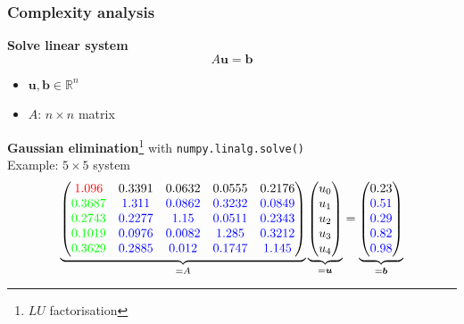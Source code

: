 \documentclass{beamer}
\begin{document}
\begin{frame}[fragile]
  \frametitle{Complexity analysis}
  \textbf{Solve linear system}
  $$
  A\boldsymbol{u}=\boldsymbol{b}$$
  \begin{itemize}
    \item $\boldsymbol{u}, \boldsymbol{b}\in\mathbb{R}^n$
    \item $A$: $n\times n$ matrix
  \end{itemize}
  \textbf{Gaussian elimination}\footnote{$LU$ factorisation} with \lstinline{numpy.linalg.solve()}\\[1ex]
  Example: $5\times 5$ system
$$
    \underbrace{
      \begin{pmatrix}
\textcolor{red}{1.096} & \textcolor{black}{0.3391} & \textcolor{black}{0.0632} & \textcolor{black}{0.0555} & \textcolor{black}{0.2176}\\
\textcolor{green}{0.3687} & \textcolor{blue}{1.311} & \textcolor{blue}{0.0862} & \textcolor{blue}{0.3232} & \textcolor{blue}{0.0849}\\
\textcolor{green}{0.2743} & \textcolor{blue}{0.2277} & \textcolor{blue}{1.15} & \textcolor{blue}{0.0511} & \textcolor{blue}{0.2343}\\
\textcolor{green}{0.1019} & \textcolor{blue}{0.0976} & \textcolor{blue}{0.0082} & \textcolor{blue}{1.285} & \textcolor{blue}{0.3212}\\
\textcolor{green}{0.3629} & \textcolor{blue}{0.2885} & \textcolor{blue}{0.012} & \textcolor{blue}{0.1747} & \textcolor{blue}{1.145}
\end{pmatrix}}_{=A}
\underbrace{\begin{pmatrix}
u_0 \\ u_1 \\ u_2 \\ u_3 \\ u_4
\end{pmatrix}}_{=\boldsymbol{u}}
=
\underbrace{
  \begin{pmatrix}
\textcolor{black}{0.23}\\
\textcolor{blue}{0.51}\\
\textcolor{blue}{0.29}\\
\textcolor{blue}{0.82}\\
\textcolor{blue}{0.98}
\end{pmatrix}}_{=\boldsymbol{b}}
$$
\end{frame}

\end{document}
